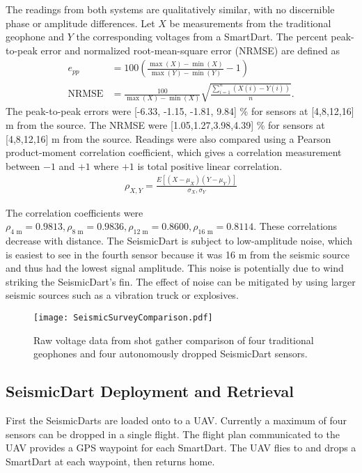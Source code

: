 The readings from both systems are qualitatively similar, with no discernible phase or amplitude differences. Let $X$ be measurements from the traditional geophone and $Y$ the corresponding voltages from a SmartDart.
The percent peak-to-peak error and normalized root-mean-square error (NRMSE) are defined as
\begin{align}
e_{pp} &= 100 \left( \frac{ \max(X) - \min(X) }{ \max(Y) - \min(Y) } -1\right) \\
  \text{NRMSE} &=\frac{100}{\max(X) - \min(X)} \sqrt{ \frac{ \sum_{i=1}^n \left( X(i) - Y(i) \right)}{n} }.\nonumber
\end{align}
The peak-to-peak errors were [-6.33, -1.15, -1.81,  9.84] \% for sensors at [4,8,12,16] m from the source.
 The NRMSE were [1.05,1.27,3.98,4.39] \% for sensors at [4,8,12,16] m from the source.
Readings were also compared using a Pearson product-moment correlation coefficient, which gives a correlation measurement between $-1$ and $+1$ where $+1$ is total positive linear correlation.
\begin{align}
\rho_{X,Y} = \frac{E\left[  (X-\mu_X) (Y-\mu_Y)  \right]}{  \sigma_X, \sigma_Y}
\end{align}

The correlation coefficients were $\rho_{\text{4 m}}  =  0.9813, \rho_{\text{8 m}}  =  0.9836, \rho_{\text{12 m}}  =  0.8600, \rho_{\text{16 m}}  = 0.8114$. These correlations decrease with distance. The SeismicDart is subject to low-amplitude noise, which is easiest to see in the fourth sensor because it was 16 m from the seismic source and thus had the lowest signal amplitude.  This noise is potentially due to wind striking the SeismicDart's fin. The effect of noise can be mitigated by using larger seismic sources such as a vibration truck or explosives.



\begin{figure} \centering
  {\texttt{[image: SeismicSurveyComparison.pdf]}}
 \caption{Raw voltage data from shot gather comparison of four traditional geophones and four autonomously dropped SeismicDart sensors.  
 \label{fig:shotgather_auto_drop}}
\end{figure}

\subsection{SeismicDart Deployment and Retrieval}
First the SeismicDarts are loaded onto to a UAV. 
Currently a maximum of four sensors can be dropped in a single flight. 
The flight plan communicated to the UAV provides a GPS waypoint for each SmartDart. 
The UAV flies to and drops a SmartDart at each waypoint, then returns home. 

